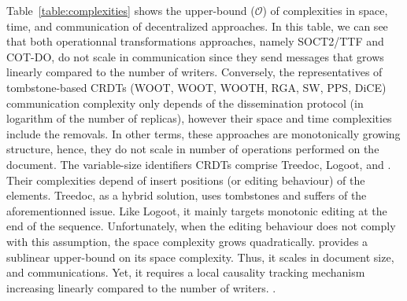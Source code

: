 Table~\ref{table:complexities} shows the upper-bound ($\mathcal{O}$)
of complexities in space, time, and communication of decentralized
approaches. In this table, we can see that both operationnal
transformations approaches, namely SOCT2/TTF and COT-DO, do not scale
in communication since they send messages that grows linearly compared
to the number of writers. Conversely, the representatives of
tombstone-based CRDTs (WOOT, WOOT, WOOTH, RGA, SW, PPS, DiCE)
communication complexity only depends of the dissemination protocol
(in logarithm of the number of replicas), however their space and time
complexities include the removals. In other terms, these approaches
are monotonically growing structure, hence, they do not scale in
number of operations performed on the document. The variable-size
identifiers CRDTs comprise Treedoc, Logoot, and \LSEQ. Their
complexities depend of insert positions (or editing behaviour) of the
elements. Treedoc, as a hybrid solution, uses tombstones and suffers
of the aforementionned issue. Like Logoot, it mainly targets monotonic
editing at the end of the sequence. Unfortunately, when the editing
behaviour does not comply with this assumption, the space complexity
grows quadratically. \LSEQ provides a sublinear upper-bound on its
space complexity. Thus, it scales in document size, and
communications. Yet, it requires a local causality tracking mechanism
increasing linearly compared to the number of
writers. .

